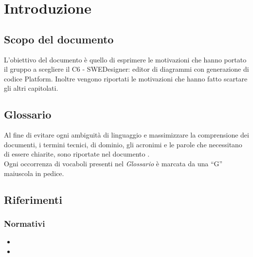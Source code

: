 \documentclass[../NormeDiProgetto.tex]{subfiles}
\begin{document}
	\section{Introduzione}
		\subsection{Scopo del documento}
			L'obiettivo del documento è quello di esprimere le motivazioni che hanno portato il gruppo \gruppo a scegliere il  C6 - SWEDesigner: editor di diagrammi  con generazione di codice Platform.
			Inoltre vengono riportati le motivazioni che hanno fatto scartare gli altri capitolati.
		\subsection{Glossario}
			Al fine di evitare ogni ambiguità di linguaggio e massimizzare la
			comprensione dei documenti, i termini tecnici, di dominio, gli
			acronimi e le parole che necessitano di essere chiarite, sono
			riportate nel documento \glossariov.\\
			Ogni occorrenza di vocaboli presenti nel \textit{Glossario} è
			marcata da una ``G'' maiuscola in pedice.
		\subsection{Riferimenti}
			\subsubsection{Normativi}
			\begin{itemize}
				\item \normediprogettoi
				\item \glossarioi
			\end{itemize}
\end{document}
